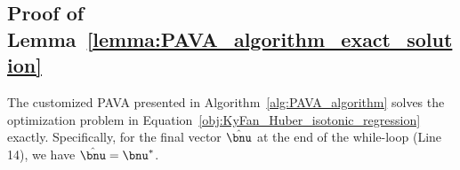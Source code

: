 \subsection{Proof of Lemma~\ref{lemma:PAVA_algorithm_exact_solution}}
\label{appendix_subsec:proof_PAVA_algorithm_exact_solution}

\begin{namedlemma}[~\ref{lemma:PAVA_algorithm_exact_solution}]
    \label{appendix_lemma:PAVA_algorithm_exact_solution}
    The customized PAVA presented in Algorithm~\ref{alg:PAVA_algorithm} solves the optimization problem in Equation~\eqref{obj:KyFan_Huber_isotonic_regression} exactly. 
    Specifically, for the final vector $\hat{\bnu}$ at the end of the while-loop (Line 14), we have $\hat{\bnu} = \bnu^*$.
\end{namedlemma}

